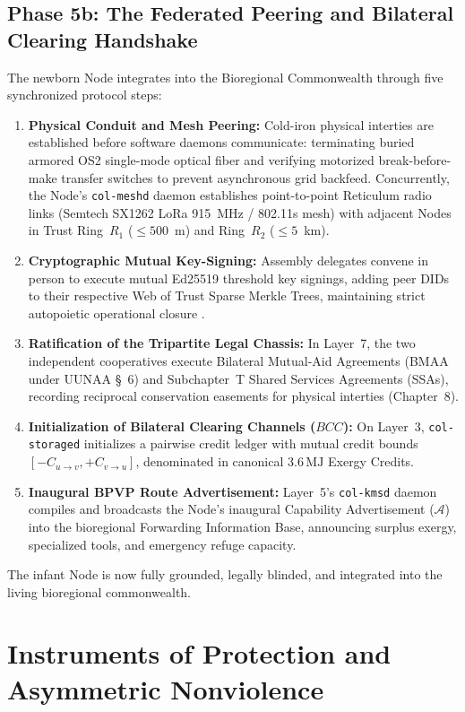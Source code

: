 \subsection{Phase 5b: The Federated Peering and Bilateral Clearing Handshake}

The newborn Node integrates into the Bioregional Commonwealth through five synchronized protocol steps:
\begin{enumerate}
    \item \textbf{Physical Conduit and Mesh Peering:} Cold-iron physical interties are established before software daemons communicate: terminating buried armored OS2 single-mode optical fiber and verifying motorized break-before-make transfer switches to prevent asynchronous grid backfeed. Concurrently, the Node's \texttt{col-meshd} daemon establishes point-to-point Reticulum radio links (Semtech SX1262 LoRa 915~MHz / 802.11s mesh) with adjacent Nodes in Trust Ring~$R_1$ ($\le 500$~m) and Ring~$R_2$ ($\le 5$~km).
    \item \textbf{Cryptographic Mutual Key-Signing:} Assembly delegates convene in person to execute mutual Ed25519 threshold key signings, adding peer DIDs to their respective Web of Trust Sparse Merkle Trees, maintaining strict autopoietic operational closure \parencite{maturana1980, luhmann1995}.
    \item \textbf{Ratification of the Tripartite Legal Chassis:} In Layer~7, the two independent cooperatives execute Bilateral Mutual-Aid Agreements (BMAA under UUNAA \S~6) and Subchapter~T Shared Services Agreements (SSAs), recording reciprocal conservation easements for physical interties (Chapter~8).
    \item \textbf{Initialization of Bilateral Clearing Channels ($BCC$):} On Layer~3, \texttt{col-storaged} initializes a pairwise credit ledger with mutual credit bounds $[-C_{u \to v}, +C_{v \to u}]$, denominated in canonical $3.6\,\mathrm{MJ}$ Exergy Credits.
    \item \textbf{Inaugural BPVP Route Advertisement:} Layer~5's \texttt{col-kmsd} daemon compiles and broadcasts the Node's inaugural Capability Advertisement ($\mathcal{A}$) into the bioregional Forwarding Information Base, announcing surplus exergy, specialized tools, and emergency refuge capacity.
\end{enumerate}
The infant Node is now fully grounded, legally blinded, and integrated into the living bioregional commonwealth.


\section{Instruments of Protection and Asymmetric Nonviolence}
\label{sec:genesis-protection}

